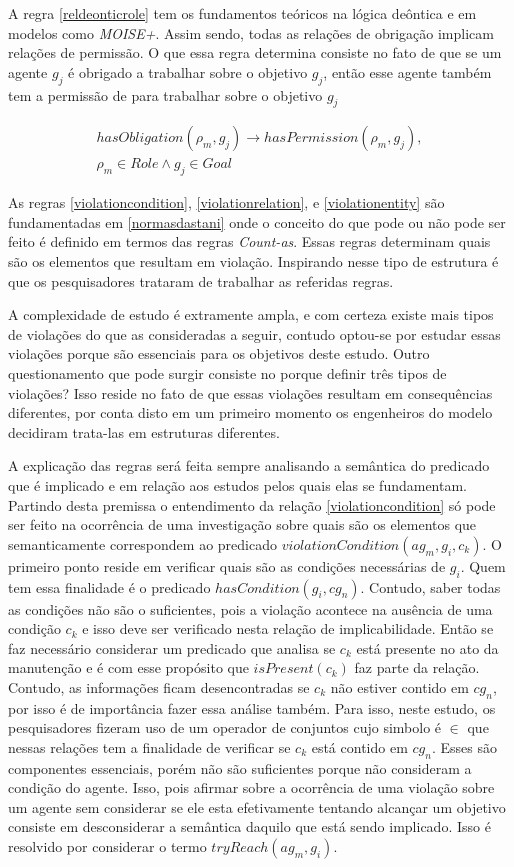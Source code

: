 A regra \ref{reldeonticrole} tem os fundamentos teóricos na lógica deôntica e em modelos como \textit{MOISE+}. Assim sendo, todas as relações de obrigação implicam relações de permissão. O que essa regra determina consiste no fato de que se um agente $g_j$ é obrigado a trabalhar sobre o objetivo $g_j$, então esse agente também tem a permissão de para trabalhar sobre o objetivo $g_j$ 

\begin{eqnarray}\label{reldeonticrole}
	hasObligation(\rho_m,g_j) \to hasPermission(\rho_m,g_j), \nonumber \\
    \rho_m \in Role \wedge g_j \in Goal
\end{eqnarray}

As regras \ref{violationcondition}, \ref{violationrelation}, e \ref{violationentity} são fundamentadas em \ref{normasdastani} onde o conceito do que pode ou não pode ser feito é definido em termos das regras \textit{Count-as}. Essas regras determinam quais são os elementos que resultam em violação. Inspirando nesse tipo de estrutura é que os pesquisadores trataram de trabalhar as referidas regras. 

A complexidade de estudo é extramente ampla, e com certeza existe mais tipos de violações do que as consideradas a seguir, contudo optou-se por estudar essas violações porque são essenciais para os objetivos deste estudo. Outro questionamento que pode surgir consiste no porque definir três tipos de violações? Isso reside no fato de que essas violações resultam em consequências diferentes, por conta disto em um primeiro momento os engenheiros do modelo decidiram trata-las em estruturas diferentes. 

A explicação das regras será feita sempre analisando a semântica do predicado que é implicado e em relação aos estudos pelos quais elas se fundamentam. Partindo desta premissa o entendimento da relação \ref{violationcondition} só pode ser feito na ocorrência de uma  investigação sobre quais são os elementos que semanticamente correspondem ao predicado $violationCondition(ag_m,g_i,c_k)$. O primeiro ponto reside em verificar quais são as condições necessárias de $g_i$. Quem tem essa finalidade é o predicado $hasCondition(g_i,cg_n)$. Contudo, saber todas as condições não são o suficientes, pois a violação acontece na ausência de uma condição $c_k$ e isso deve ser verificado nesta relação de implicabilidade. Então se faz necessário considerar um predicado que analisa se $c_k$ está presente no ato da manutenção e é com esse propósito que $isPresent(c_k)$ faz parte da relação. Contudo, as informações ficam desencontradas se $c_k$ não estiver contido em $cg_n$, por isso é de importância fazer essa análise também. Para isso, neste estudo, os pesquisadores fizeram uso de um operador de conjuntos cujo simbolo é $\in$ que nessas relações tem a finalidade de verificar se $c_k$ está contido em $cg_n$. Esses são componentes essenciais, porém não são suficientes porque não consideram a condição do agente. Isso, pois afirmar sobre a ocorrência de uma violação sobre um agente sem considerar se ele esta efetivamente tentando alcançar um objetivo consiste em desconsiderar a semântica daquilo que está sendo implicado. Isso é resolvido por considerar o termo  $tryReach(ag_m,g_i)$. 


